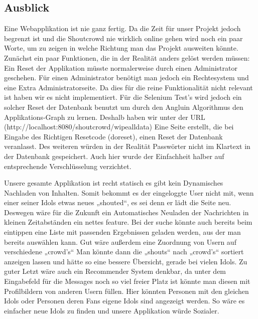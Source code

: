 \subsection{Ausblick}
Eine Webapplikation ist nie ganz fertig. Da die Zeit für unser Projekt jedoch begrenzt ist und die Shoutcrowd nie wirklich online gehen wird noch ein paar Worte, um zu zeigen in welche Richtung man das Projekt ausweiten könnte. Zunächst ein paar Funktionen, die in der Realität anders gelöst werden müssen:
Ein Reset der Applikation müsste normalerweise durch einen Administrator geschehen. Für einen Administrator benötigt man jedoch ein Rechtesystem und eine Extra Administratorseite. Da dies  für die reine Funktionalität nicht relevant ist haben wir es nicht implementiert. Für die Selenium Test's wird jedoch ein solcher Reset der Datenbank benutzt um durch den Angluin Algorithmus den Applikations-Graph zu lernen. Deshalb haben wir unter der URL (http://localhost:8080/shoutcrowd/wipealldata)
Eine Seite erstellt, die bei Eingabe des Richtigen Resetcode (doreset), einen Reset der Datenbank veranlasst. Des weiteren würden in der Realität Passwörter nicht im Klartext in der Datenbank gespeichert. Auch hier wurde der Einfachheit halber auf entsprechende Verschlüsselung verzichtet.

Unsere gesamte Applikation ist recht statisch es gibt kein Dynamisches Nachladen von Inhalten. Somit bekommt es der eingeloggte User nicht mit, wenn einer seiner Idols etwas neues „shouted“, es sei denn er lädt die Seite neu. Deswegen wäre für die Zukunft ein Automatisches Neuladen der Nachrichten in kleinen Zeitabständen ein nettes feature. Bei der suche könnte auch bereits beim eintippen eine Liste mit passenden Ergebnissen geladen werden, aus der man bereits auswählen kann. 
Gut wäre außerdem eine Zuordnung von Usern auf verschiedene „crowd's“ Man könnte dann die „shouts“ nach „crowd's“ sortiert anzeigen lassen und hätte so eine bessere Übersicht, gerade bei vielen Idols.
Zu guter Letzt wäre auch ein Recommender System denkbar, da unter dem Eingabefeld für die Messages noch so viel freier Platz ist könnte man diesen mit Profilbildern von anderen Usern füllen. Hier könnten Personen mit den gleichen Idols oder Personen deren Fans eigene Idols sind angezeigt werden. So wäre es einfacher neue Idols zu finden und unsere Applikation würde Sozialer.

